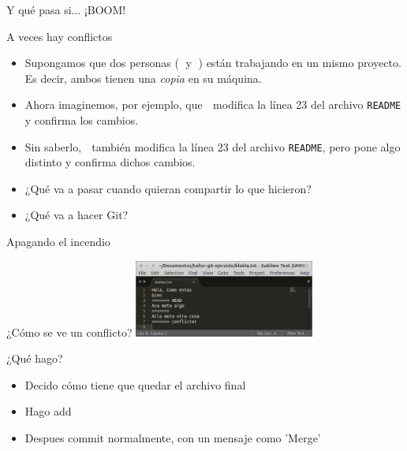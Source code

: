 \begin{frame}[t]{Y qué pasa si... ¡BOOM!}

    \begin{block}{A veces hay conflictos}
        \begin{itemize}
            \item Supongamos que dos personas (👨 y 👩) están trabajando en un mismo proyecto.
                Es decir, ambos tienen una \textit{copia} en su máquina.
            \pause
            \item Ahora imaginemos, por ejemplo, que 👨 modifica la línea 23 del archivo \texttt{README}
                y confirma los cambios.
            \pause
            \item Sin saberlo, 👩 también modifica la línea 23 del archivo \texttt{README}, pero pone algo distinto y confirma dichos cambios.
            \pause
            \item ¿Qué va a pasar cuando quieran compartir lo que hicieron?\\ 
            \pause
            \item ¿Qué va a hacer Git?\\ 
        \end{itemize}
    \end{block}

\end{frame}

\begin{frame}[t]{Apagando el incendio}

    \begin{block}{¿Cómo se ve un conflicto?}
        \includegraphics[height=1.0in]{images/conflicto.png}
    \end{block}

    \begin{block}{¿Qué hago?}
        \begin{itemize}
        \item Decido cómo tiene que quedar el archivo final  
        \pause
        \item Hago add
		\pause
        \item
        Despues commit normalmente, con un mensaje como 'Merge' 
        \end{itemize}
    \end{block}

\end{frame}


